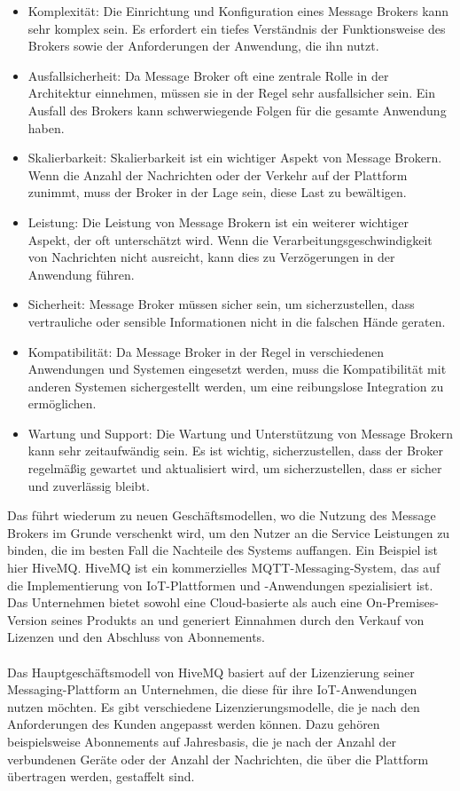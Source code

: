 \documentclass[../vs-script-first-v01.tex]{subfiles}
\begin{document}
\begin{itemize}
\item Komplexität: Die Einrichtung und Konfiguration eines Message Brokers kann sehr komplex sein. Es erfordert ein tiefes Verständnis der Funktionsweise des Brokers sowie der Anforderungen der Anwendung, die ihn nutzt.
\item Ausfallsicherheit: Da Message Broker oft eine zentrale Rolle in der Architektur einnehmen, müssen sie in der Regel sehr ausfallsicher sein. Ein Ausfall des Brokers kann schwerwiegende Folgen für die gesamte Anwendung haben.
\item Skalierbarkeit: Skalierbarkeit ist ein wichtiger Aspekt von Message Brokern. Wenn die Anzahl der Nachrichten oder der Verkehr auf der Plattform zunimmt, muss der Broker in der Lage sein, diese Last zu bewältigen.
\item Leistung: Die Leistung von Message Brokern ist ein weiterer wichtiger Aspekt, der oft unterschätzt wird. Wenn die Verarbeitungsgeschwindigkeit von Nachrichten nicht ausreicht, kann dies zu Verzögerungen in der Anwendung führen.
\item Sicherheit: Message Broker müssen sicher sein, um sicherzustellen, dass vertrauliche oder sensible Informationen nicht in die falschen Hände geraten.
\item Kompatibilität: Da Message Broker in der Regel in verschiedenen Anwendungen und Systemen eingesetzt werden, muss die Kompatibilität mit anderen Systemen sichergestellt werden, um eine reibungslose Integration zu ermöglichen.
\item Wartung und Support: Die Wartung und Unterstützung von Message Brokern kann sehr zeitaufwändig sein. Es ist wichtig, sicherzustellen, dass der Broker regelmäßig gewartet und aktualisiert wird, um sicherzustellen, dass er sicher und zuverlässig bleibt.
\end{itemize}
Das führt wiederum zu neuen Geschäftsmodellen, wo die Nutzung des Message Brokers im Grunde verschenkt wird, um den Nutzer an die Service Leistungen zu binden, die im besten Fall die Nachteile des Systems auffangen. 
Ein Beispiel ist hier HiveMQ. HiveMQ ist ein kommerzielles MQTT-Messaging-System, das auf die Implementierung von IoT-Plattformen und -Anwendungen spezialisiert ist. Das Unternehmen bietet sowohl eine Cloud-basierte als auch eine On-Premises-Version seines Produkts an und generiert Einnahmen durch den Verkauf von Lizenzen und den Abschluss von Abonnements.
\\\\
Das Hauptgeschäftsmodell von HiveMQ basiert auf der Lizenzierung seiner Messaging-Plattform an Unternehmen, die diese für ihre IoT-Anwendungen nutzen möchten. Es gibt verschiedene Lizenzierungsmodelle, die je nach den Anforderungen des Kunden angepasst werden können. Dazu gehören beispielsweise Abonnements auf Jahresbasis, die je nach der Anzahl der verbundenen Geräte oder der Anzahl der Nachrichten, die über die Plattform übertragen werden, gestaffelt sind.
\end{document}

